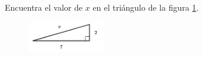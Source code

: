 \question[15]  Encuentra el valor de $x$ en el triángulo de la figura \ref{fig:lados_pitagoras_18}.
\begin{figure}[H]
    \begin{center}
        \includegraphics[width=0.3\textwidth]{../images/lados_pitagoras_18.png}
    \end{center}
    \caption{}
    \label{fig:lados_pitagoras_18}
\end{figure}